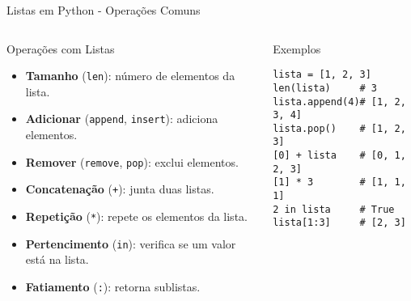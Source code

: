 \begin{frame}[fragile]{Listas em Python - Operações Comuns}

    \begin{columns}[T]
        \begin{block}{Operações com Listas}
            \begin{itemize}
                \item \textbf{Tamanho} (\texttt{len}): número de elementos da lista.
                \item \textbf{Adicionar} (\texttt{append}, \texttt{insert}): adiciona elementos.
                \item \textbf{Remover} (\texttt{remove}, \texttt{pop}): exclui elementos.
                \item \textbf{Concatenação} (\texttt{+}): junta duas listas.
                \item \textbf{Repetição} (\texttt{*}): repete os elementos da lista.
                \item \textbf{Pertencimento} (\texttt{in}): verifica se um valor está na lista.
                \item \textbf{Fatiamento} (\texttt{:}): retorna sublistas.
            \end{itemize}
        \end{block}

        \begin{block}{Exemplos}
            \begin{verbatim}
lista = [1, 2, 3]
len(lista)     # 3
lista.append(4)# [1, 2, 3, 4]
lista.pop()    # [1, 2, 3]
[0] + lista    # [0, 1, 2, 3]
[1] * 3        # [1, 1, 1]
2 in lista     # True
lista[1:3]     # [2, 3]
\end{verbatim}
        \end{block}
    \end{columns}

\end{frame}

